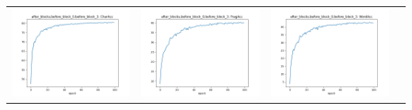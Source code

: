 \begin{longtable}{cccc}
\includegraphics[scale=0.2]{./images/mixup_position/after_blocks;before_block_0;before_block_3_CharAcc.png} & \includegraphics[scale=0.2]{./images/mixup_position/after_blocks;before_block_0;before_block_3_FragAcc.png} & \includegraphics[scale=0.2]{./images/mixup_position/after_blocks;before_block_0;before_block_3_WordAcc.png}\\

\end{longtable}
